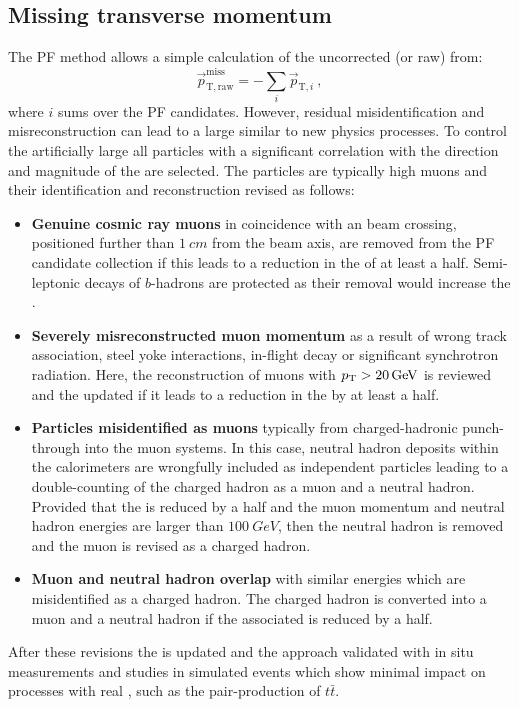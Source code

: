 \subsection{Missing transverse momentum}

The PF method allows a simple calculation of the uncorrected (or raw) \ptmiss
from:
%
\begin{equation}
    \vec{p}_{\mathrm{T,raw}}^{\mathrm{miss}} = - \sum_{i} \vec{p}_{\mathrm{T},i}\ ,
\end{equation}
%
where $i$ sums over the PF candidates. However, residual misidentification and
misreconstruction can lead to a large \ptmiss similar to new physics
processes. To control the artificially large \ptmiss all particles with a
significant correlation with the direction and magnitude of the \ptmiss are
selected. The particles are typically high \pt muons and their identification
and reconstruction revised as follows:
%
\begin{itemize}
    \item \textbf{Genuine cosmic ray muons} in coincidence with an \LHC beam
    crossing, positioned further than ${\SI{1}{cm}}$ from the beam axis, are
    removed from the PF candidate collection if this leads to a reduction in
    the \ptmiss of at least a half. Semi-leptonic decays of $b$-hadrons are
    protected as their removal would increase the \ptmiss.
    \item \textbf{Severely misreconstructed muon momentum} as a result of
    wrong track association, steel yoke interactions, in-flight decay or
    significant synchrotron radiation. Here, the reconstruction of muons with
    ${p_{\text{T}}>\SI{20}{GeV}}$ is reviewed and the \pt updated if it leads to a
    reduction in the \ptmiss by at least a half.
    \item \textbf{Particles misidentified as muons} typically from
    charged-hadronic punch-through into the muon systems. In this case, neutral
    hadron deposits within the calorimeters are wrongfully included as
    independent particles leading to a double-counting of the charged hadron
    as a muon and a neutral hadron. Provided that the \ptmiss is reduced by a
    half and the muon momentum and neutral hadron energies are larger than
    ${\SI{100}{GeV}}$, then the neutral hadron is removed and the muon is
    revised as a charged hadron.
    \item \textbf{Muon and neutral hadron overlap} with similar energies which
    are misidentified as a charged hadron. The charged hadron is converted
    into a muon and a neutral hadron if the associated \ptmiss is reduced by a
    half.
\end{itemize}
%
After these revisions the \ptmiss is updated and the approach validated with
in situ measurements and studies in simulated events which show minimal impact
on processes with real \ptmiss, such as the pair-production of $t\bar{t}$.


